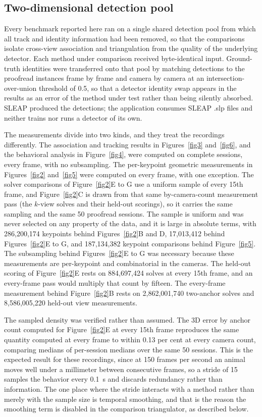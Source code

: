 \documentclass[pdflatex, sn-nature]{sn-jnl}
\theoremstyle{thmstyleone}%
\theoremstyle{thmstyletwo}%
\theoremstyle{thmstylethree}%
\begin{document}
\subsection{Two-dimensional detection pool}\label{methods-pool}

Every benchmark reported here ran on a single shared detection pool from which all track and identity information had been removed, so that the comparisons isolate cross-view association and triangulation from the quality of the underlying detector. Each method under comparison received byte-identical input. Ground-truth identities were transferred onto that pool by matching detections to the proofread instances frame by frame and camera by camera at an intersection-over-union threshold of 0.5, so that a detector identity swap appears in the results as an error of the method under test rather than being silently absorbed. SLEAP produced the detections; the application consumes SLEAP .slp files and neither trains nor runs a detector of its own.

The measurements divide into two kinds, and they treat the recordings differently. The association and tracking results in Figures~\ref{fig3} and~\ref{fig6}, and the behavioral analysis in Figure~\ref{fig4}, were computed on complete sessions, every frame, with no subsampling. The per-keypoint geometric measurements in Figures~\ref{fig2} and~\ref{fig5} were computed on every frame, with one exception. The solver comparisons of Figure~\ref{fig2}E to G use a uniform sample of every 15th frame, and Figure~\ref{fig2}C is drawn from that same by-camera-count measurement pass (the $k$-view solves and their held-out scorings), so it carries the same sampling and the same 50 proofread sessions. The sample is uniform and was never selected on any property of the data, and it is large in absolute terms, with 286,200,174 keypoints behind Figures~\ref{fig2}B and D, 17,013,412 behind Figures~\ref{fig2}E to G, and 187,134,382 keypoint comparisons behind Figure~\ref{fig5}. The subsampling behind Figures~\ref{fig2}E to G was necessary because these measurements are per-keypoint and combinatorial in the cameras. The held-out scoring of Figure~\ref{fig2}E rests on 884,697,424 solves at every 15th frame, and an every-frame pass would multiply that count by fifteen. The every-frame measurement behind Figure~\ref{fig2}B rests on 2,862,001,740 two-anchor solves and 8,586,005,220 held-out view measurements.

The sampled density was verified rather than assumed. The 3D error by anchor count computed for Figure~\ref{fig2}E at every 15th frame reproduces the same quantity computed at every frame to within 0.13 per cent at every camera count, comparing medians of per-session medians over the same 50 sessions. This is the expected result for these recordings, since at 150 frames per second an animal moves well under a millimeter between consecutive frames, so a stride of 15 samples the behavior every 0.1~s and discards redundancy rather than information. The one place where the stride interacts with a method rather than merely with the sample size is temporal smoothing, and that is the reason the smoothing term is disabled in the comparison triangulator, as described below.
\end{document}
